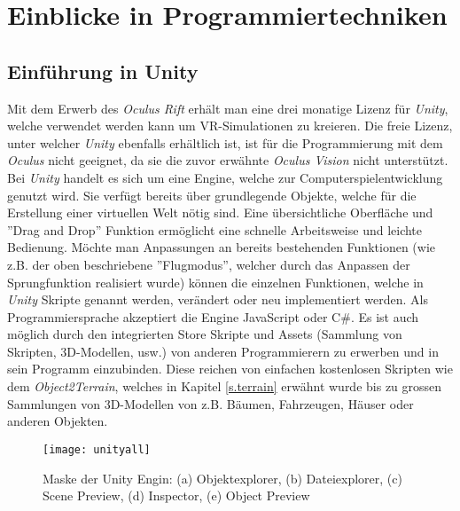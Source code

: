 \chapter{Einblicke in Programmiertechniken}\label{c.programing}
\vspace{-20pt}
\section{Einführung in Unity}\label{s.unity}
Mit dem Erwerb des \textit{Oculus Rift} erhält man eine drei monatige Lizenz für \textit{Unity}, welche verwendet werden kann um VR-Simulationen zu kreieren. Die freie Lizenz, unter welcher \textit{Unity} ebenfalls erhältlich ist, ist für die Programmierung mit dem \textit{Oculus} nicht geeignet, da sie die zuvor erwähnte \textit{Oculus Vision} nicht unterstützt.\\[6pt]
Bei \textit{Unity} handelt es sich um eine Engine, welche zur Computerspielentwicklung genutzt wird. Sie verfügt bereits über grundlegende Objekte, welche für die Erstellung einer virtuellen Welt nötig sind. Eine übersichtliche Oberfläche und ''Drag and Drop'' Funktion ermöglicht eine schnelle Arbeitsweise und leichte Bedienung. Möchte man Anpassungen an bereits bestehenden Funktionen (wie z.B. der oben beschriebene ''Flugmodus'', welcher durch das Anpassen der Sprungfunktion realisiert wurde) können die einzelnen Funktionen, welche in \textit{Unity} Skripte genannt werden, verändert oder neu implementiert werden. Als Programmiersprache akzeptiert die Engine JavaScript oder C\#. Es ist auch möglich durch den integrierten Store Skripte und Assets (Sammlung von Skripten, 3D-Modellen, usw.) von anderen Programmierern zu erwerben und in sein Programm einzubinden. Diese reichen von einfachen kostenlosen Skripten wie dem \textit{Object2Terrain}, welches in Kapitel \ref{s.terrain} erwähnt wurde bis zu grossen Sammlungen von 3D-Modellen von z.B. Bäumen, Fahrzeugen, Häuser oder anderen Objekten.\\[6pt]

\newpage
\begin{figure}[ht]
	\vspace{-20pt}
	\begin{center}
		\texttt{[image: unityall]}
	\end{center}
	\vspace{-15pt}
	\caption[Maske der Unity Engin]{Maske der Unity Engin: (a) Objektexplorer, (b) Dateiexplorer, (c) Scene Preview, (d) Inspector, (e) Object Preview}\label{unityall}
	\vspace{-12pt}
\end{figure}

